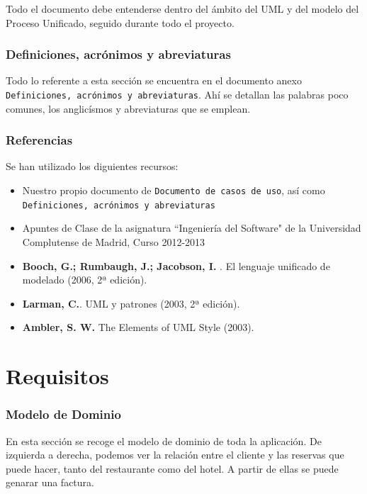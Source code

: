 \documentclass[spanish,a4paper,11pt, twoside]{report}	%
\begin{document}
	Todo el documento debe entenderse dentro del ámbito del UML y del modelo del Proceso Unificado, seguido durante todo el proyecto.

\section{Definiciones, acrónimos y abreviaturas}

	Todo lo referente a esta sección se encuentra en el documento anexo \texttt{Definiciones, acrónimos y abreviaturas}. Ahí se detallan las palabras poco comunes, los anglicísmos y abreviaturas que se emplean.

	\section{Referencias}
	Se han utilizado los diguientes recursos:
	\begin{itemize}
		\item Nuestro propio documento de \texttt{Documento de casos de uso}, así como \\ \texttt{Definiciones, acrónimos y abreviaturas}
		\item Apuntes de Clase de la asignatura “Ingeniería del Software" de la Universidad Complutense de Madrid, Curso 2012-2013
		\item \textbf{Booch, G.; Rumbaugh, J.; Jacobson, I. }. El lenguaje unificado de modelado (2006, 2ª edición).
		\item \textbf{Larman, C.}. UML y patrones (2003, 2ª edición).
		\item \textbf{Ambler, S. W.} The Elements of UML Style (2003).
	\end{itemize}

\newpage
\mbox{}
\thispagestyle{empty}						%
\newpage





\setcounter{section}{0}
\part{Requisitos}
	\section{Modelo de Dominio}
	En esta sección se recoge el modelo de dominio de toda la aplicación. De izquierda a derecha, podemos ver la relación entre el cliente y las reservas que puede hacer, tanto del restaurante como del hotel. A partir de ellas se puede genarar una factura. 
\end{document}
